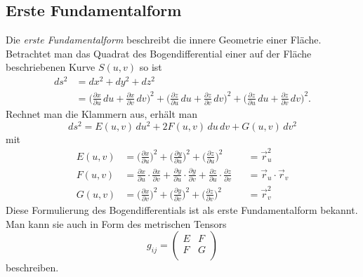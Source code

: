 \subsection{Erste Fundamentalform
\label{mongeampere:subsection:finibus}}
Die \emph{erste Fundamentalform} beschreibt die innere Geometrie einer Fläche.
%
%
Betrachtet man das Quadrat des Bogendifferential einer auf der Fläche 
%
beschriebenen Kurve $S(u,v)$ so ist 
\begin{equation}
  \begin{split}
    d s^2 &= d x^2 + d y^2 + d z^2 \\
          &= \biggl(\frac{\partial x}{\partial u}\,d u + \frac{\partial x}{\partial v}\,d v  \biggr)^2
          + \biggl(\frac{\partial z}{\partial u}\,d u + \frac{\partial z}{\partial v}\,d v  \biggr)^2
          + \biggl(\frac{\partial z}{\partial u}\,d u + \frac{\partial z}{\partial v}\,d v  \biggr)^2.
  \end{split}
  \label{mongeampere:bogdiff}
\end{equation}
Rechnet man die Klammern aus, erhält man 
\begin{equation}
    d s^2 = E(u,v) \,d u^2 + 2F(u,v) \,d u \,d v + G(u,v)\,d v^2
    \label{mongeampere:1fundform}
\end{equation}
mit
\begin{equation*}
\begin{aligned}
     E(u,v) &= \biggl(\frac{\partial x}{\partial u} \biggr)^2 +
     \biggl(\frac{\partial y}{\partial u} \biggr)^2 +
     \biggl(\frac{\partial z}{\partial u} \biggr)^2 
            &&= \vec r_u^2\\
     F(u,v) &= 
     \frac{\partial x}{\partial u} \cdot \frac{\partial x}{\partial v} +
     \frac{\partial y}{\partial u} \cdot \frac{\partial y}{\partial v} +
     \frac{\partial z}{\partial u} \cdot \frac{\partial z}{\partial v}
            &&= \vec r_u \cdot \vec r_v \\
      G(u,v) &= \biggl(\frac{\partial x}{\partial v} \biggr)^2 +
     \biggl(\frac{\partial y}{\partial v} \biggr)^2 +
     \biggl(\frac{\partial z}{\partial v} \biggr)^2 
             &&= \vec r_v ^2
  \label{mongeampere:1fundbed}
\end{aligned}
\end{equation*}
Diese Formulierung des Bogendifferentials ist als erste Fundamentalform bekannt.
Man kann sie auch in Form des metrischen Tensors 
\begin{equation}
  g_{ij} = \begin{pmatrix}
    E & F \\
    F & G \\
  \end{pmatrix}
  \label{mongeampere:erstmettens}
\end{equation}
beschreiben.

